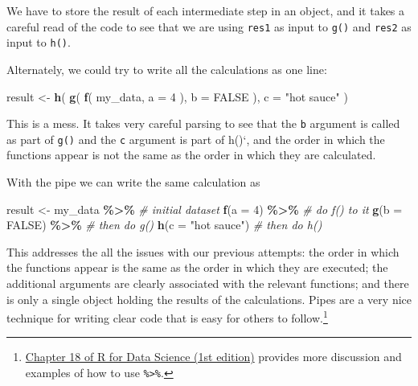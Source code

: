 \documentclass[
]{book}
\newenvironment{Shaded}{\begin{snugshade}}{\end{snugshade}}
\newcommand{\AttributeTok}[1]{\textcolor[rgb]{0.13,0.29,0.53}{#1}}
\newcommand{\CommentTok}[1]{\textcolor[rgb]{0.56,0.35,0.01}{\textit{#1}}}
\newcommand{\ConstantTok}[1]{\textcolor[rgb]{0.56,0.35,0.01}{#1}}
\newcommand{\DecValTok}[1]{\textcolor[rgb]{0.00,0.00,0.81}{#1}}
\newcommand{\FunctionTok}[1]{\textcolor[rgb]{0.13,0.29,0.53}{\textbf{#1}}}
\newcommand{\NormalTok}[1]{#1}
\newcommand{\OtherTok}[1]{\textcolor[rgb]{0.56,0.35,0.01}{#1}}
\newcommand{\SpecialCharTok}[1]{\textcolor[rgb]{0.81,0.36,0.00}{\textbf{#1}}}
\newcommand{\StringTok}[1]{\textcolor[rgb]{0.31,0.60,0.02}{#1}}
\begin{document}
We have to store the result of each intermediate step in an object, and it takes a careful read of the code to see that we are using \texttt{res1} as input to \texttt{g()} and \texttt{res2} as input to \texttt{h()}.

Alternately, we could try to write all the calculations as one line:

\begin{Shaded}
\begin{Highlighting}[]
\NormalTok{result }\OtherTok{\textless{}{-}} \FunctionTok{h}\NormalTok{( }\FunctionTok{g}\NormalTok{( }\FunctionTok{f}\NormalTok{( my\_data, }\AttributeTok{a =} \DecValTok{4}\NormalTok{ ), }\AttributeTok{b =} \ConstantTok{FALSE}\NormalTok{ ), }\AttributeTok{c =} \StringTok{"hot sauce"}\NormalTok{ )}
\end{Highlighting}
\end{Shaded}

This is a mess. It takes very careful parsing to see that the \texttt{b} argument is called as part of \texttt{g()} and the \texttt{c} argument is part of h()`, and the order in which the functions appear is not the same as the order in which they are calculated.

With the pipe we can write the same calculation as

\begin{Shaded}
\begin{Highlighting}[]
\NormalTok{result }\OtherTok{\textless{}{-}} 
\NormalTok{  my\_data }\SpecialCharTok{\%\textgreater{}\%}        \CommentTok{\# initial dataset}
  \FunctionTok{f}\NormalTok{(}\AttributeTok{a =} \DecValTok{4}\NormalTok{) }\SpecialCharTok{\%\textgreater{}\%}       \CommentTok{\# do f() to it}
  \FunctionTok{g}\NormalTok{(}\AttributeTok{b =} \ConstantTok{FALSE}\NormalTok{) }\SpecialCharTok{\%\textgreater{}\%}   \CommentTok{\# then do g()}
  \FunctionTok{h}\NormalTok{(}\AttributeTok{c =} \StringTok{"hot sauce"}\NormalTok{) }\CommentTok{\# then do h()}
\end{Highlighting}
\end{Shaded}

This addresses the all the issues with our previous attempts:
the order in which the functions appear is the same as the order in which they are executed;
the additional arguments are clearly associated with the relevant functions;
and there is only a single object holding the results of the calculations.
Pipes are a very nice technique for writing clear code that is easy for others to follow.\footnote{\href{https://r4ds.had.co.nz/pipes.html}{Chapter 18 of R for Data Science (1st edition)} provides more discussion and examples of how to use \texttt{\%\textgreater{}\%}.}
\end{document}
